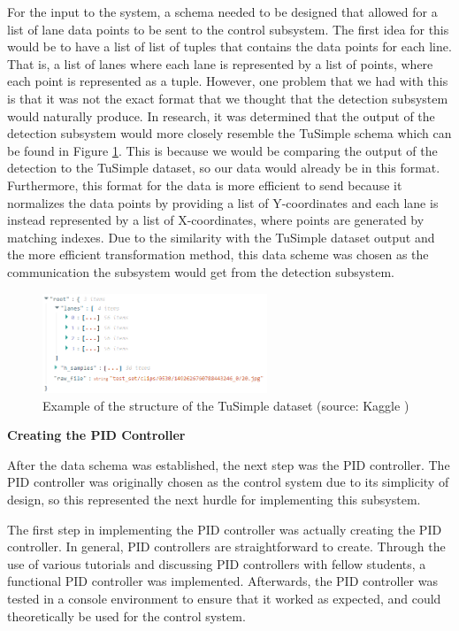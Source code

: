 \documentclass[titlepage, draft]{article}
\begin{document}
{For the input to the system, a schema needed to be designed that allowed for a list of lane data points to be sent to the control subsystem. The first idea for this would be to have a list of list of tuples that contains the data points for each line. That is, a list of lanes where each lane is represented by a list of points, where each point is represented as a tuple. However, one problem that we had with this is that it was not the exact format that we thought that the detection subsystem would naturally produce. In research, it was determined that the output of the detection subsystem would more closely resemble the TuSimple schema which can be found in Figure \ref{fig:tusimple_dataformat}. This is because we would be comparing the output of the detection to the TuSimple dataset, so our data would already be in this format. Furthermore, this format for the data is more efficient to send because it normalizes the data points by providing a list of Y-coordinates and each lane is instead represented by a list of X-coordinates, where points are generated by matching indexes. Due to the similarity with the TuSimple dataset output and the more efficient transformation method, this data scheme was chosen as the communication the subsystem would get from the detection subsystem. \\

\begin{figure}
	\centering
	\includegraphics[width=0.6\textwidth]{tusimple_data_example}
	\caption{Example of the structure of the TuSimple dataset (source: Kaggle \cite{tusimpleStructure})}
	\label{fig:tusimple_dataformat}
\end{figure}

\textbf{Creating the PID Controller}

After the data schema was established, the next step was the PID controller. The PID controller was originally chosen as the control system due to its simplicity of design, so this represented the next hurdle for implementing this subsystem.

The first step in implementing the PID controller was actually creating the PID controller. In general, PID controllers are straightforward to create. Through the use of various tutorials and discussing PID controllers with fellow students, a functional PID controller was implemented. Afterwards, the PID controller was tested in a console environment to ensure that it worked as expected, and could theoretically be used for the control system.

}
\end{document}
